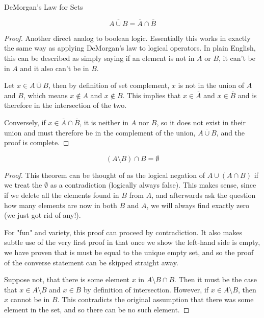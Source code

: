 \documentclass{standalone}
\begin{document}
\begin{theorem}
  DeMorgan's Law for Sets

  \[
    \overline{A \cup B} = \overline{A} \cap \overline{B}
  \]
\end{theorem}

\begin{proof}
  Another direct analog to boolean logic. Essentially this works in exactly the
  same way as applying DeMorgan's law to logical operators. In plain English,
  this can be described as simply saying if an element is not in $A$ or $B$, it
  can't be in $A$ and it also can't be in $B$.

  Let $x \in \overline{A \cup B}$, then by definition of set complement, $x$ is not
  in the union of $A$ and $B$, which means $x \not \in A$ and $x \not \in B$.
  This implies that $x \in \overline{A}$ and $x \in \overline{B}$ and is therefore in the
  intersection of the two.

  Conversely, if $x \in \overline{A} \cap \overline{B}$, it is neither in $A$ nor $B$, so
  it does not exist in their union and must therefore be in the complement of
  the union, $\overline{A \cup B}$, and the proof is complete.
\end{proof}

\begin{theorem}
  \[
    (A \setminus B) \cap B = \emptyset
  \]
\end{theorem}

\begin{proof}
  This theorem can be thought of as the logical negation of $A \cup (A \cap B)$
  if we treat the $\emptyset$ as a contradiction (logically always false). This
  makes sense, since if we delete all the elements found in $B$ from $A$, and
  afterwards ask the question how many elements are now in both $B$ and $A$, we
  will always find exactly zero (we just got rid of any!).

  For "fun" and variety, this proof can proceed by contradiction. It also makes
  subtle use of the very first proof in that once we show the left-hand side is
  empty, we have proven that is must be equal to the unique empty set, and so
  the proof of the converse statement can be skipped straight away.

  Suppose not, that there is some element $x$ in $A \setminus B \cap B$. Then
  it must be the case that $x \in A \setminus B$ and $x \in B$ by definition of
  intersection. However, if $x \in A \setminus B$, then $x$ cannot be in $B$.
  This contradicts the original assumption that there was some element in the
  set, and so there can be no such element.
\end{proof}
\end{document}
